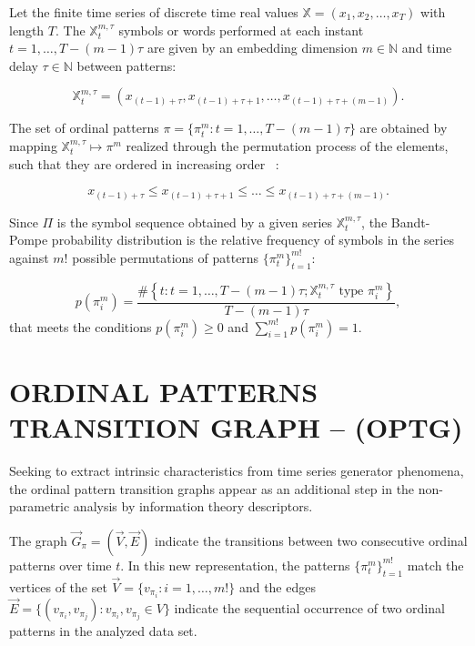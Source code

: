 \documentclass{isprs}
\begin{document}
	Let the finite time series of discrete time real values $\mathbb{X} = (x_1, x_2, \dots, x_T)$ with length $T$.
	The $\mathbb{X}_t^{m, \tau} $ symbols or words performed at each instant $t = 1, \dots, T- (m-1) \tau$ are given by an embedding dimension $m \in \mathbb{N}$ and time delay $\tau \in \mathbb{N}$ between patterns:
	
	\begin{equation}
	\mathbb{X}_t^{m,\tau} = (x_{(t-1)+\tau}, x_{(t-1)+\tau+1},\ldots, x_{(t-1)+\tau+(m-1)}).
	\end{equation}
	
	The set of ordinal patterns $\pi = \{\pi_t^m: t = 1, \dots, T- (m-1) \tau \}$ are obtained by mapping $\mathbb{X}^{m, \tau}_t \mapsto \pi^m$ realized through the permutation process of the elements, such that they are ordered in increasing order ~\citep{Ravetti2014noise}:
	
	$$x_{(t-1) + \tau} \leq x_{(t-1) + \tau + 1} \leq \dots \leq x_{(t-1) + \tau + (m-1)}.$$
	
	Since $\Pi$ is the symbol sequence obtained by a given series $\mathbb{X}_t^{m,\tau}$, the Bandt-Pompe probability distribution is the relative frequency of symbols in the series against $m!$ possible permutations of patterns $\{\pi_t^m \}_{t = 1}^{m!}$:
	
	\begin{equation}
	p(\pi_i^m) = \frac{\#\left \{t : t = 1, \dots, T-(m-1)\tau; \mathbb{X}_t^{m,\tau} \text{ type } \pi_i^m\right \}}{T- (m-1)\tau},  
	\end{equation}
	that meets the conditions $p(\pi_i^m) \ge 0$ and  $\sum_{i=1}^{m!} p(\pi_i^m) = 1$.
	
	\section{ORDINAL PATTERNS TRANSITION GRAPH -- (OPTG)}\label{OPTG}
	
	Seeking to extract intrinsic characteristics from time series generator phenomena, the ordinal pattern transition graphs appear as an additional step in the non-parametric analysis by information theory descriptors.
	
	The graph $\vec{G}_{\pi} = (\vec{V}, \vec{E})$ indicate the transitions between two consecutive ordinal patterns over time $t$.
	In this new representation, the patterns $\{\pi_t^m \}_{t = 1}^{m!}$ match the vertices of the set $\vec{V} = \{v_{\pi_i}: i = 1, \dots, m! \}$ and the edges $\vec{E} = \{(v_{\pi_i}, v_{\pi_j}): v_{\pi_i}, v_{\pi_j} \in V \}$ indicate the sequential occurrence of two ordinal patterns in the analyzed data set.
	
\end{document}
